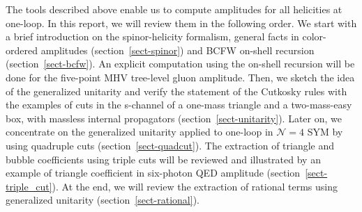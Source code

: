 The tools described above enable us to compute amplitudes for all helicities at one-loop.
In this report, we will review them in the following order.
We start with a brief introduction on the spinor-helicity formalism, general facts in color-ordered amplitudes (section~\ref{sect-spinor}) and BCFW on-shell recursion (section~\ref{sect-bcfw}).
An explicit computation using the on-shell recursion will be done for the five-point MHV tree-level gluon amplitude. 
Then, we sketch the idea of the generalized unitarity and verify the statement of the Cutkosky rules with the examples of cuts in the s-channel of a one-mass triangle and a two-mass-easy box, with massless internal propagators (section~\ref{sect-unitarity}).
Later on, we concentrate on the generalized unitarity applied to one-loop in $\mathcal{N}=4$ SYM by using quadruple cuts (section~\ref{sect-quadcut}).
The extraction of triangle and bubble coefficients using triple cuts will be reviewed and illustrated by an example of triangle coefficient in six-photon QED amplitude (section~\ref{sect-triple_cut}).
At the end, we will review the extraction of rational terms using generalized unitarity (section~\ref{sect-rational}).










